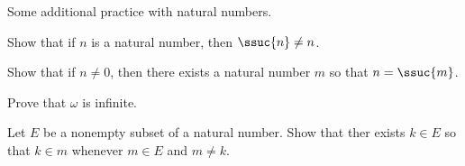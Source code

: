 

Some additional practice with natural numbers.


\begin{exercise}
  Show that if $n$ is a natural number, then $\ssuc{n} \neq n$.
\end{exercise}

\begin{exercise}
  Show that if $n \neq 0$, then there exists a natural number $m$ so that $n = \ssuc{m}$.
\end{exercise}

\begin{exercise}
  Prove that $\omega$ is infinite.
\end{exercise}

\begin{exercise}
  Let $E$ be a nonempty subset of a natural number.
  Show that ther exists $k \in E$ so that $k \in m$ whenever $m \in E$ and $m \neq k$.
\end{exercise}

\blankpage
